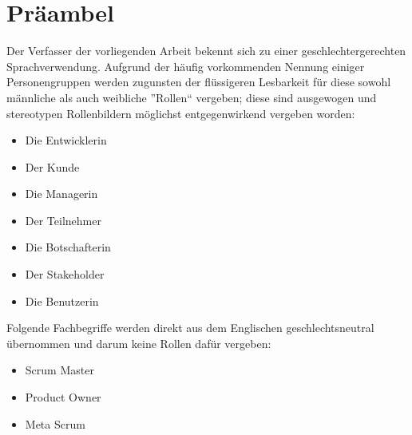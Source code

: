 \newpage
\chapter*{Präambel}

Der Verfasser der vorliegenden Arbeit bekennt sich zu einer geschlechtergerechten Sprachverwendung. Aufgrund der häufig vorkommenden Nennung einiger Personengruppen werden zugunsten der flüssigeren Lesbarkeit für diese sowohl männliche als auch weibliche ”Rollen“ vergeben; diese sind ausgewogen und stereotypen Rollenbildern möglichst entgegenwirkend vergeben worden:

\begin{itemize}
    \item Die Entwicklerin
    \item Der Kunde
    \item Die Managerin
    \item Der Teilnehmer
    \item Die Botschafterin
    \item Der Stakeholder
    \item Die Benutzerin
\end{itemize}

Folgende Fachbegriffe werden direkt aus dem Englischen geschlechtsneutral übernommen und darum keine Rollen dafür vergeben:

\begin{itemize}
    \item Scrum Master
    \item Product Owner
    \item Meta Scrum
\end{itemize}
